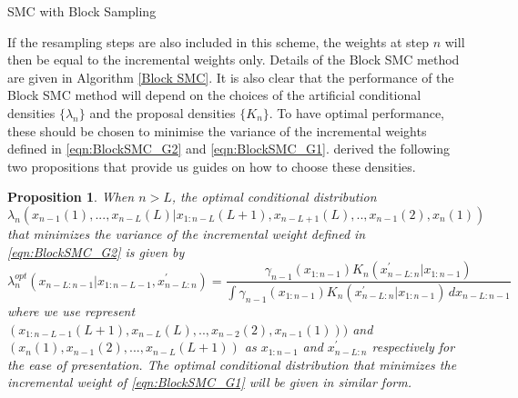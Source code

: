 \documentclass[12pt,a4paper]{article}
\newtheorem{proposition}{Proposition}
\begin{document}
\begin{algorithm}[htb!]
    \caption{SMC with Block Sampling} \label{Block SMC}
\end{algorithm}
If the resampling steps are also included in this scheme, the weights at step $n$ will then be equal to the incremental weights only. Details of the Block SMC method are given in Algorithm \ref{Block SMC}. It is also clear that the performance of the Block SMC method will depend on the choices of the artificial conditional densities \(\{\lambda_n\}\) and the proposal densities \(\{K_n\}\). To have optimal performance, these should be chosen to minimise the variance of the incremental weights defined in \eqref{eqn:BlockSMC_G2} and \eqref{eqn:BlockSMC_G1}. \cite{doucet2006efficient} derived the following two propositions that provide us guides on how to choose these densities. 
\begin{proposition}\label{optimal lambda}
    When \(n>L\), the optimal conditional distribution \[\lambda_n(x_{n-1}(1),...,x_{n-L}(L)|x_{1:n-L}(L+1),x_{n-L+1}(L),..,x_{n-1}(2),x_n(1))\] that minimizes the variance of the incremental weight defined in \eqref{eqn:BlockSMC_G2} is given by
    \begin{equation}
        \label{eqn:BlockSMC_optimallambda}
        \lambda_n^{opt}(x_{n-L:n-1}|x_{1:n-L-1},x_{n-L:n}^{'}) = \frac{\gamma_{n-1}(x_{1:n-1})K_n(x_{n-L:n}^{'}|x_{1:n-1})}{\int \gamma_{n-1}(x_{1:n-1})K_n(x_{n-L:n}^{'}|x_{1:n-1})\,dx_{n-L:n-1}}
    \end{equation}
    where we use represent \((x_{1:n-L-1}(L+1),x_{n-L}(L),..,x_{n-2}(2),x_{n-1}(1)))\) and \((x_{n}(1),x_{n-1}(2),...,x_{n-L}(L+1))\) as \(x_{1:n-1}\) and \(x_{n-L:n}^{'}\) respectively for the ease of presentation. The optimal conditional distribution that minimizes the incremental weight of \eqref{eqn:BlockSMC_G1} will be given in similar form. 
\end{proposition}
\end{document}
